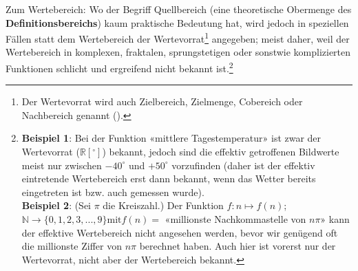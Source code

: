 \begin{bemerkung}{}{}
  Zum Wertebereich: Wo der Begriff Quellbereich (eine theoretische Obermenge
  des \textbf{Definitionsbereichs}) kaum praktische Bedeutung hat,
  wird jedoch in speziellen Fällen statt dem Wertebereich der
  Wertevorrat\footnote{Der Wertevorrat
    wird auch Zielbereich, Zielmenge,
    Cobereich oder Nachbereich
    genannt (\cite{FormelnUndTafeln19}).}
  angegeben; meist daher, weil der
  Wertebereich in komplexen, fraktalen, sprungstetigen oder sonstwie komplizierten Funktionen schlicht
  und ergreifend nicht bekannt ist.\footnote{\textbf{Beispiel 1}: Bei der Funktion
    «mittlere Tagestemperatur» ist zwar der Wertevorrat ($\mathbb{R}[{}^\circ]$)
    bekannt, jedoch sind die effektiv getroffenen Bildwerte meist nur
    zwischen $-40^\circ$ und $+50^\circ$ vorzufinden (daher ist der
    effektiv eintretende Wertebereich erst dann bekannt, wenn das Wetter
    bereits eingetreten ist bzw. auch gemessen wurde). \\
    \textbf{Beispiel 2}: (Sei $\pi$ die Kreiszahl.) Der Funktion $f: n\mapsto f(n)$; $\mathbb{N} \rightarrow \{0, 1, 2, 3, ..., 9\} \text{mit} f(n) = $
    «millionste Nachkommastelle von $n\pi$»
    kann der effektive Wertebereich nicht
  angesehen werden, bevor wir genügend oft die millionste Ziffer von
  $n\pi$ berechnet haben. Auch hier ist vorerst nur der Wertevorrat, nicht
  aber der Wertebereich bekannt.}
\end{bemerkung}







\newpage



